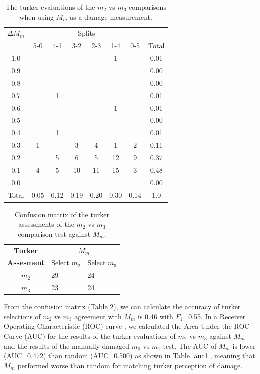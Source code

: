 \begin{table}
\begin{tabular}{ c | c | c | c | c | c | c || c}
    {$\Delta M_m$} &  \multicolumn{6}{c}{Splits}\\
  & 5-0 & 4-1 & 3-2 & 2-3 & 1-4 & 0-5 & Total\\
\hline
1.0 &  &  &  &  & 1 & & 0.01\\
0.9 &  &  &  &  &  & & 0.00\\
0.8 &  &  &  &  &  & & 0.00\\
0.7 &  & 1 &  &  &  & & 0.01\\
0.6 &  &  &  &  & 1 & & 0.01\\
0.5 &  &  &  &  &  & & 0.00\\
0.4 &  & 1 &  &  &  & & 0.01\\
0.3 & 1 &  & 3 & 4 & 1 & 2& 0.11\\
0.2 &  & 5 & 6 & 5 & 12 & 9& 0.37\\
0.1 & 4 & 5 & 10 & 11 & 15 & 3& 0.48\\
0.0 &  &  &  &  &  & & 0.00\\
\hline
Total & 0.05 & 0.12 & 0.19 & 0.20 & 0.30 & 0.14 & 1.0
\end{tabular}
  \caption{The turker evaluations of the $m_2$ vs $m_3$ comparisons when using $M_m$ as a damage measurement.}
  \label{m1table}
\end{table}

\begin{table}
\centering
\begin{tabular}{cll}
\textbf{Turker} & \multicolumn{2}{c}{ \textbf{ $M_{m}$}}                           \\
\textbf{Assesment}                  &          Select $m_{2}$             &           Select $m_{3}$             \\ \cline{2-3} 
       $m_{2}$           & \multicolumn{1}{|l}{29} & \multicolumn{1}{|l|}{24} \\ \cline{2-3} 
       $m_{3}$           & \multicolumn{1}{|l}{23} & \multicolumn{1}{|l|}{24} \\ \cline{2-3} 
\end{tabular}
  \caption{Confusion matrix of the turker assessments of the $m_2$ vs $m_3$ comparison test against $M_m$.}
  \label{m1cm}
\end{table}



From the confusion matrix (Table \ref{m1cm}), we can calculate the accuracy of turker selections of $m_2$ vs $m_3$ agreement with $M_m$ is 0.46 with $F_1$=0.55. In a Receiver Operating Characteristic (ROC) curve \cite{fawcett2006introduction}, we calculated the Area Under the ROC Curve (AUC) for the results of the turker evaluations of $m_2$ vs $m_3$ against $M_m$ and the results of the manually damaged $m_0$ vs $m_1$ test. The AUC of $M_m$ is lower (AUC=0.472) than random (AUC=0.500) as shown in Table \ref{auc1}, meaning that $M_m$ performed worse than random for matching turker perception of damage.


